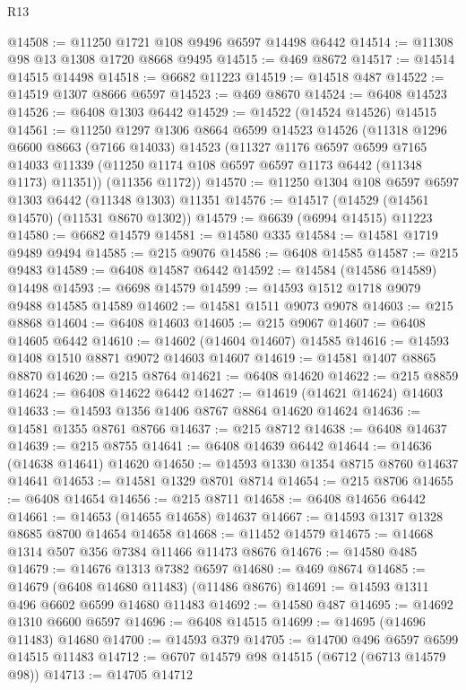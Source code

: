 \begin{lexlean}{R13}
\begin{coremodule}
@14508 := @11250 @1721 @108 @9496 @6597 @14498 @6442
@14514 := @11308 @98 @13 @1308 @1720 @8668 @9495
@14515 := @469 @8672
@14517 := @14514 @14515 @14498
@14518 := @6682 @11223
@14519 := @14518 @487
@14522 := @14519 @1307 @8666 @6597
@14523 := @469 @8670
@14524 := @6408 @14523
@14526 := @6408 @1303 @6442
@14529 := @14522 (@14524 @14526) @14515
@14561 := @11250
    @1297
    @1306
    @8664
    @6599
    @14523
    @14526
    (@11318
      @1296
      @6600
      @8663
      (@7166 @14033)
      @14523
      (@11327
        @1176
        @6597
        @6599
        @7165
        @14033
        @11339
        (@11250 @1174 @108 @6597 @6597 @1173 @6442 (@11348 @1173) @11351))
      (@11356 @1172))
@14570 := @11250 @1304 @108 @6597 @6597 @1303 @6442 (@11348 @1303) @11351
@14576 := @14517 (@14529 (@14561 @14570) (@11531 @8670 @1302))
@14579 := @6639 (@6994 @14515) @11223
@14580 := @6682 @14579
@14581 := @14580 @335
@14584 := @14581 @1719 @9489 @9494
@14585 := @215 @9076
@14586 := @6408 @14585
@14587 := @215 @9483
@14589 := @6408 @14587 @6442
@14592 := @14584 (@14586 @14589) @14498
@14593 := @6698 @14579
@14599 := @14593 @1512 @1718 @9079 @9488 @14585 @14589
@14602 := @14581 @1511 @9073 @9078
@14603 := @215 @8868
@14604 := @6408 @14603
@14605 := @215 @9067
@14607 := @6408 @14605 @6442
@14610 := @14602 (@14604 @14607) @14585
@14616 := @14593 @1408 @1510 @8871 @9072 @14603 @14607
@14619 := @14581 @1407 @8865 @8870
@14620 := @215 @8764
@14621 := @6408 @14620
@14622 := @215 @8859
@14624 := @6408 @14622 @6442
@14627 := @14619 (@14621 @14624) @14603
@14633 := @14593 @1356 @1406 @8767 @8864 @14620 @14624
@14636 := @14581 @1355 @8761 @8766
@14637 := @215 @8712
@14638 := @6408 @14637
@14639 := @215 @8755
@14641 := @6408 @14639 @6442
@14644 := @14636 (@14638 @14641) @14620
@14650 := @14593 @1330 @1354 @8715 @8760 @14637 @14641
@14653 := @14581 @1329 @8701 @8714
@14654 := @215 @8706
@14655 := @6408 @14654
@14656 := @215 @8711
@14658 := @6408 @14656 @6442
@14661 := @14653 (@14655 @14658) @14637
@14667 := @14593 @1317 @1328 @8685 @8700 @14654 @14658
@14668 := @11452 @14579
@14675 := @14668 @1314 @507 @356 @7384 @11466 @11473 @8676
@14676 := @14580 @485
@14679 := @14676 @1313 @7382 @6597
@14680 := @469 @8674
@14685 := @14679 (@6408 @14680 @11483) (@11486 @8676)
@14691 := @14593 @1311 @496 @6602 @6599 @14680 @11483
@14692 := @14580 @487
@14695 := @14692 @1310 @6600 @6597
@14696 := @6408 @14515
@14699 := @14695 (@14696 @11483) @14680
@14700 := @14593 @379
@14705 := @14700 @496 @6597 @6599 @14515 @11483
@14712 := @6707 @14579 @98 @14515 (@6712 (@6713 @14579 @98))
@14713 := @14705 @14712

\end{coremodule}
\end{lexlean}
